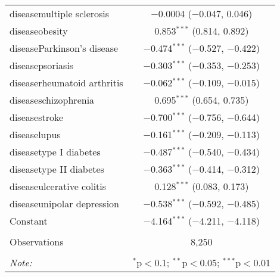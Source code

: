 \begin{table}[!htbp]
\begin{tabular}{@{\extracolsep{5pt}}lc}
  diseasemultiple sclerosis & $-$0.0004 ($-$0.047, 0.046) \\ 
  diseaseobesity & 0.853$^{***}$ (0.814, 0.892) \\ 
  diseaseParkinson's disease & $-$0.474$^{***}$ ($-$0.527, $-$0.422) \\ 
  diseasepsoriasis & $-$0.303$^{***}$ ($-$0.353, $-$0.253) \\ 
  diseaserheumatoid arthritis & $-$0.062$^{***}$ ($-$0.109, $-$0.015) \\ 
  diseaseschizophrenia & 0.695$^{***}$ (0.654, 0.735) \\ 
  diseasestroke & $-$0.700$^{***}$ ($-$0.756, $-$0.644) \\ 
  diseaselupus & $-$0.161$^{***}$ ($-$0.209, $-$0.113) \\ 
  diseasetype I diabetes & $-$0.487$^{***}$ ($-$0.540, $-$0.434) \\ 
  diseasetype II diabetes & $-$0.363$^{***}$ ($-$0.414, $-$0.312) \\ 
  diseaseulcerative colitis & 0.128$^{***}$ (0.083, 0.173) \\ 
  diseaseunipolar depression & $-$0.538$^{***}$ ($-$0.592, $-$0.485) \\ 
  Constant & $-$4.164$^{***}$ ($-$4.211, $-$4.118) \\ 
 \hline \\[-1.8ex] 
Observations & 8,250 \\ 
\hline 
\hline \\[-1.8ex] 
\textit{Note:}  & \multicolumn{1}{r}{$^{*}$p$<$0.1; $^{**}$p$<$0.05; $^{***}$p$<$0.01} \\ 
\end{tabular} 
\end{table} 
